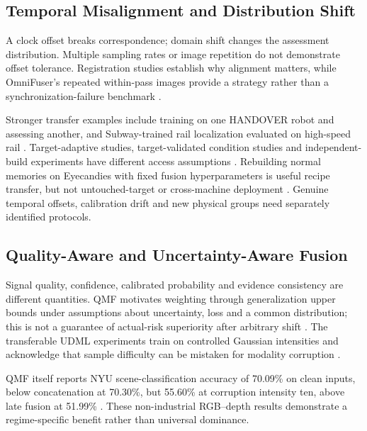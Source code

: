 \subsection{Temporal Misalignment and Distribution Shift}
A clock offset breaks correspondence; domain shift changes the assessment distribution. Multiple sampling rates or image repetition do not demonstrate offset tolerance. Registration studies establish why alignment matters, while OmniFuser's repeated within-pass images provide a strategy rather than a synchronization-failure benchmark \citep{Petrich2021Multimodal,Chen2023Multisensor,P021}.

Stronger transfer examples include training on one HANDOVER robot and assessing another, and Subway-trained rail localization evaluated on high-speed rail \citep[PDF p.~7, Table~V]{Thoduka2024Handover}\citep[PDF p.~10, Table~III]{P031}. Target-adaptive studies, target-validated condition studies and independent-build experiments have different access assumptions \citep{Wang2025A,Chu2024A,Huang2026Rolling,Bevans2023Heterogeneous}. Rebuilding normal memories on Eyecandies with fixed fusion hyperparameters is useful recipe transfer, but not untouched-target or cross-machine deployment \citep{P026,P033}. Genuine temporal offsets, calibration drift and new physical groups need separately identified protocols.

\subsection{Quality-Aware and Uncertainty-Aware Fusion}
Signal quality, confidence, calibrated probability and evidence consistency are different quantities. QMF motivates weighting through generalization upper bounds under assumptions about uncertainty, loss and a common distribution; this is not a guarantee of actual-risk superiority after arbitrary shift \citep[PDF pp.~4--5]{Zhang2023QMF}. The transferable UDML experiments train on controlled Gaussian intensities and acknowledge that sample difficulty can be mistaken for modality corruption \citep[PDF pp.~4--5, 9]{P022}.

QMF itself reports NYU scene-classification accuracy of 70.09\% on clean inputs, below concatenation at 70.30\%, but 55.60\% at corruption intensity ten, above late fusion at 51.99\% \citep[PDF p.~8, Table~1]{Zhang2023QMF}. These non-industrial RGB--depth results demonstrate a regime-specific benefit rather than universal dominance.

